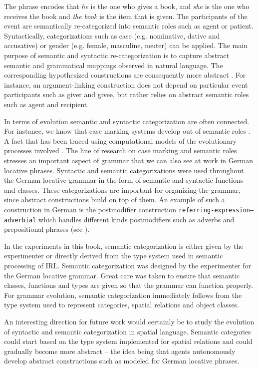 The phrase encodes that \emph{he} is the one who gives a book, and \emph{she} is 
the one who receives the book and \emph{the book} is the item that is given. 
The participants of the event are semantically re-categorized into semantic roles 
such as agent or patient. Syntactically, categorizations such as case (e.g. 
nominative, dative and accusative) or gender (e.g. female, masculine, neuter)
can be applied. The main purpose of semantic and syntactic re-categorization 
is to capture abstract semantic and grammatical mappings observed in 
natural language. The corresponding hypothesized constructions 
are consequently more abstract \citep{steels2011phrasal}. For instance,
an argument-linking construction does not depend on particular event participants
such as giver and givee, but rather relies on abstract semantic roles such
as agent and recipient.

In terms of evolution semantic and syntactic categorization are often connected. 
For instance, we know that case marking systems develop out of 
semantic roles \citep{blake1994case}. A fact that has been traced using computational
models of the evolutionary processes involved \citep{vantrijp2008phd}.
The line of research on case marking and semantic roles 
\citep{steels2002case,vantrijp2008phd} stresses an important
aspect of grammar that we can also see at work in German locative phrases.
Syntactic and semantic categorizations were used throughout the 
German locative grammar in the form of semantic and syntactic functions
and classes. These categorizations are important for organizing the grammar,
since abstract constructions build on top of them. An example of such a construction
in German is the postmodifier construction 
{\footnotesize\tt referring-expression--adverbial} which handles different kinds postmodifiers 
such as adverbs and prepositional phrases (see ). 

In the experiments in this book, semantic categorization is either given by the 
experimenter or directly derived from the type system used in semantic processing 
of IRL. Semantic categorization was designed by the experimenter for the 
German locative grammar. Great care was taken to ensure that semantic classes, 
functions and types are given so that the grammar can function properly. For grammar 
evolution, semantic categorization immediately follows from the type system 
used to represent categories, spatial relations and object classes.

An interesting direction for future work would certainly be to study the evolution of
syntactic and semantic categorization in spatial language. Semantic categories 
could start based on the type system implemented for spatial relations and
could gradually become more abstract -- the idea being that agents autonomously 
develop abstract constructions such as modeled for German locative phrases.

%
%
%

%
